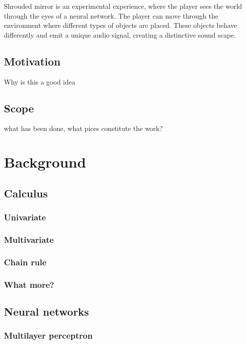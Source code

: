 \documentclass[a4paper, twoside, 10pt]{report}
\makeatletter
\newcommand{\figsourcefont}{\footnotesize}
\newcommand{\figsource}[1]{%
  \addtocontents{lof}{%
    {\leftskip\cftfigindent
     \advance\leftskip\cftfignumwidth
     \rightskip\@tocrmarg
     \figsourcefont#1\protect\par}%
  }%
 }
\makeatother
\begin{document}
Shrouded mirror is an experimental experience, where the player sees the world through the eyes of a neural network. The player can move through the environment where different types of objects are placed. These objects behave differently and emit a unique audio signal, creating a distinctive sound scape.

\section{Motivation}
Why is this a good idea

\section{Scope}
what has been done, what pices constitute the work?



\chapter{Background}

\section{Calculus}
\subsection{Univariate}
\subsection{Multivariate}
\subsection{Chain rule}
\subsection{What more?}
\section{Neural networks}
\subsection{Multilayer perceptron}
\end{document}
